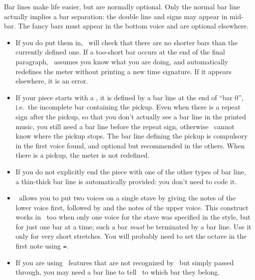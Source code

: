 \documentclass[11pt]{article}
\begin{document}
Bar lines make life easier, but are normally optional.  Only the
normal bar line actually implies a bar separation: the double line and
 signs may appear in mid-bar.  The fancy bars must appear
in the bottom voice and are optional elsewhere.
  \begin{itemize}
    \item  If you do put them in, \MTx\ will check that there are no shorter 
bars than the currently defined one.   If a too-short bar occurs at the end of 
the final paragraph, \MTx\ assumes you know what you are doing, and 
automatically redefines the meter without printing a new time signature.  If 
it appears elsewhere, it is an error. 
    \item  If your piece starts with a , it is defined by a bar 
line at the end of ``bar 0'', i.e.~the incomplete bar containing the pickup. 
Even when there is a repeat sign after the pickup, so that you don't actually 
see a bar line in the printed music, you still need a bar line before the 
repeat sign, otherwise \MTx\ cannot know where the pickup stops.  The bar line 
defining the pickup is compulsory in the first voice found, and optional but 
recommended in the others.      When there is a pickup, the meter is not 
redefined. 
    \item   If you do not explicitly end the piece with 
one of the other types of bar line, a thin-thick bar line is 
automatically provided: you don't need to code it. 
    \item  \PMX\ allows you to put two voices on a single stave by
giving the notes of the lower voice first, followed by \ttxem{//} and the 
notes of the upper voice.  This construct works in \MTx\ too when only
one voice for the stave was specified in the style, but for just 
one bar at a time; such a bar \emph{must} be terminated by a bar line. 
Use it only for very short stretches.  You will probably need to
set the octave in the first note using \verb"=".
  \item  If you are using \PMX\ features that are not recognized by \MTx\ but 
simply passed through, you may need a bar line to tell \MTx\ to which bar 
they belong.  
 \end{itemize} 
\end{document}
